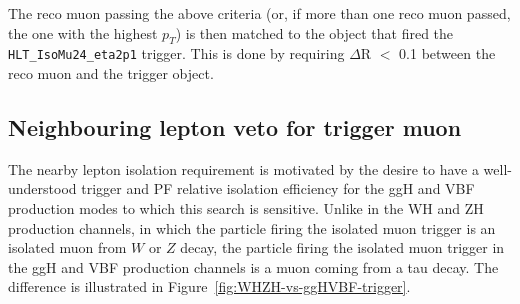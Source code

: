 The reco muon passing the above criteria (or, if more than one reco muon passed, the one with the highest $p_T$) is then matched to the object that fired the \texttt{HLT\_IsoMu24\_eta2p1} trigger. This is done by requiring $\Delta$R $<$ 0.1 between the reco muon and the trigger object.

\subsection{Neighbouring lepton veto for trigger muon\label{sec:evtsel-leptonveto}}

The nearby lepton isolation requirement is motivated by the desire to have a well-understood trigger and PF relative isolation efficiency for the ggH and VBF production modes to which this search is sensitive.  Unlike in the WH and ZH production channels, in which the particle firing the isolated muon trigger is an isolated muon from $W$ or $Z$ decay, the particle firing the isolated muon trigger in the ggH and VBF production channels is a muon coming from a tau decay.  The difference is illustrated in Figure~\ref{fig:WHZH-vs-ggHVBF-trigger}.

